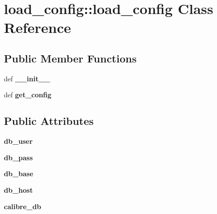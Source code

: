 \hypertarget{classload__config_1_1load__config}{
\section{load\_\-config::load\_\-config Class Reference}
\label{classload__config_1_1load__config}
}
\subsection*{Public Member Functions}
\begin{DoxyCompactItemize}
\item 
\hypertarget{classload__config_1_1load__config_aa6edd77153e28dd4fe10fe1cc5db3374}{
def {\bfseries \_\-\_\-init\_\-\_\-}}
\label{classload__config_1_1load__config_aa6edd77153e28dd4fe10fe1cc5db3374}

\item 
\hypertarget{classload__config_1_1load__config_af763b115632a51305f617268f71dafbb}{
def {\bfseries get\_\-config}}
\label{classload__config_1_1load__config_af763b115632a51305f617268f71dafbb}

\end{DoxyCompactItemize}
\subsection*{Public Attributes}
\begin{DoxyCompactItemize}
\item 
\hypertarget{classload__config_1_1load__config_ab751681c579311a7864dab80ea48b632}{
{\bfseries db\_\-user}}
\label{classload__config_1_1load__config_ab751681c579311a7864dab80ea48b632}

\item 
\hypertarget{classload__config_1_1load__config_a8e392e407c13c66afa2401625db06bfc}{
{\bfseries db\_\-pass}}
\label{classload__config_1_1load__config_a8e392e407c13c66afa2401625db06bfc}

\item 
\hypertarget{classload__config_1_1load__config_aafc7c9bd0812763c9d14300891312e30}{
{\bfseries db\_\-base}}
\label{classload__config_1_1load__config_aafc7c9bd0812763c9d14300891312e30}

\item 
\hypertarget{classload__config_1_1load__config_adc527ad1403cf44d5570acc511edab3a}{
{\bfseries db\_\-host}}
\label{classload__config_1_1load__config_adc527ad1403cf44d5570acc511edab3a}

\item 
\hypertarget{classload__config_1_1load__config_a3106047394f09c3afb233837d07510d4}{
{\bfseries calibre\_\-db}}
\label{classload__config_1_1load__config_a3106047394f09c3afb233837d07510d4}

\end{DoxyCompactItemize}


